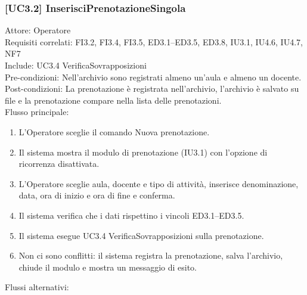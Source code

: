 \subsubsection{[UC3.2] InserisciPrenotazioneSingola}
\noindent Attore: Operatore\\
Requisiti correlati: FI3.2, FI3.4, FI3.5, ED3.1–ED3.5, ED3.8, IU3.1, IU4.6, IU4.7, NF7\\
Include: UC3.4 VerificaSovrapposizioni\\
Pre-condizioni: Nell'archivio sono registrati almeno un'aula e almeno un docente.\\
Post-condizioni: La prenotazione è registrata nell'archivio, l'archivio è salvato su file e la prenotazione compare nella lista delle prenotazioni.\\

\noindent Flusso principale:
\begin{enumerate}
\item L'Operatore sceglie il comando Nuova prenotazione.
\item Il sistema mostra il modulo di prenotazione (IU3.1) con l'opzione di ricorrenza disattivata.
\item L'Operatore sceglie aula, docente e tipo di attività, inserisce denominazione, data, ora di inizio e ora di fine e conferma.
\item Il sistema verifica che i dati rispettino i vincoli ED3.1–ED3.5.
\item Il sistema esegue UC3.4 VerificaSovrapposizioni sulla prenotazione.
\item Non ci sono conflitti: il sistema registra la prenotazione, salva l'archivio, chiude il modulo e mostra un messaggio di esito.
\end{enumerate}
\noindent Flussi alternativi:
